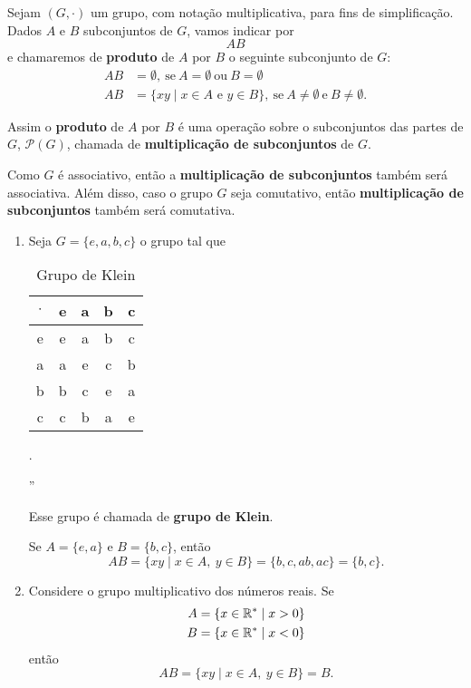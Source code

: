 Sejam $(G, \cdot)$ um grupo, com notação multiplicativa, para fins de simplificação. Dados $A$ e $B$ subconjuntos de $G$, vamos indicar por
\[
    AB
\]
e chamaremos de \textbf{produto} de $A$ por $B$ o seguinte subconjunto de $G$:
\begin{align*}
    AB &= \emptyset,\ \mbox{se}\ A = \emptyset\ \mbox{ou}\ B = \emptyset\\
    AB &= \{xy \mid x \in A \mbox{ e } y \in B\},\ \mbox{se}\ A \ne \emptyset\ \mbox{e}\ B \ne \emptyset.
\end{align*}

Assim o \textbf{produto} de $A$ por $B$ é uma operação sobre o subconjuntos das partes de $G$, $\mathcal{P}(G)$, chamada de \textbf{multiplicação de subconjuntos} de $G$.

Como $G$ é associativo, então a \textbf{multiplicação de subconjuntos} também será associativa. Além disso, caso o grupo $G$ seja comutativo, então \textbf{multiplicação de subconjuntos} também será comutativa.

\begin{exemplos}
    \begin{enumerate}[label={\arabic*})]
        \item Seja $G = \{e, a, b, c\}$ o grupo tal que
        \begin{center}
            \begin{table}[htp]
                \centering
                \caption{Grupo de Klein}
                \begin{tabular}{|c|c|c|c|c|}
                    \hline
                    $\cdot$ & e & a & b & c\\
                    \hline
                    e & e & a & b & c\\
                    \hline
                    a & a & e & c & b\\
                    \hline
                    b & b & c & e & a\\
                    \hline
                    c & c & b & a & e\\
                    \hline
                \end{tabular}.
            \end{table}    ''
        \end{center}

        Esse grupo é chamada de \textbf{grupo de Klein}.

        Se $A = \{e, a\}$ e $B = \{b, c\}$, então
        \[
            AB = \{xy \mid x \in A,\ y \in B\} = \{b, c, ab, ac\} = \{b, c\}.
        \]

        \item Considere o grupo multiplicativo dos números reais. Se
        \begin{align*}
            A &= \{x \in \mathbb{R}^* \mid x > 0\}\\
            B &= \{x \in \mathbb{R}^* \mid x < 0\}
        \end{align*}
        então
        \[
            AB = \{xy \mid x \in A,\ y \in B\} = B.
        \]
    \end{enumerate}
\end{exemplos}


